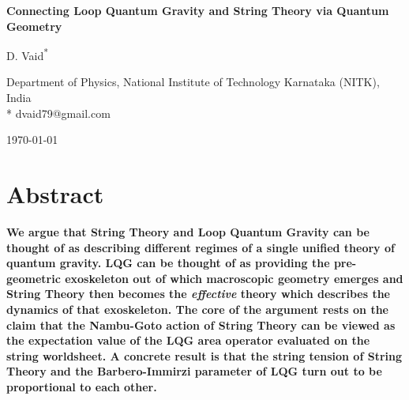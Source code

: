 \documentclass[submission, Phys]{SciPost}
\begin{document}
\begin{center}{\Large \textbf{
Connecting Loop Quantum Gravity and String Theory via Quantum Geometry
}}\end{center}

\begin{center}
D. Vaid\textsuperscript{*}
\end{center}

\begin{center}
Department of Physics, National Institute of Technology Karnataka (NITK), India \\
* dvaid79@gmail.com
\end{center}

\begin{center}
\today
\end{center}


\section*{Abstract}
{\bf
We argue that String Theory and Loop Quantum Gravity can be thought of as describing different regimes of a single unified theory of quantum gravity. LQG can be thought of as providing the pre-geometric exoskeleton out of which macroscopic geometry emerges and String Theory then becomes the \emph{effective} theory which describes the dynamics of that exoskeleton. The core of the argument rests on the claim that the Nambu-Goto action of String Theory can be viewed as the expectation value of the LQG area operator evaluated on the string worldsheet. A concrete result is that the string tension of String Theory and the Barbero-Immirzi parameter of LQG turn out to be proportional to each other.
}
\end{document}
